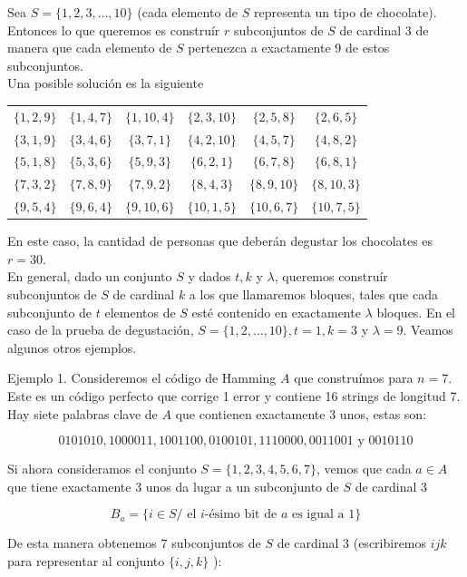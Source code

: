 \documentclass[10pt]{article}
\begin{document}
Sea $S=\{1,2,3, \ldots, 10\}$ (cada elemento de $S$ representa un tipo de chocolate). Entonces lo que queremos es construír $r$ subconjuntos de $S$ de cardinal 3 de manera que cada elemento de $S$ pertenezca a exactamente 9 de estos subconjuntos.\\
Una posible solución es la siguiente

\begin{center}
\begin{tabular}{cccccc}
$\{1,2,9\}$ & $\{1,4,7\}$ & $\{1,10,4\}$ & $\{2,3,10\}$ & $\{2,5,8\}$ & $\{2,6,5\}$ \\
$\{3,1,9\}$ & $\{3,4,6\}$ & $\{3,7,1\}$ & $\{4,2,10\}$ & $\{4,5,7\}$ & $\{4,8,2\}$ \\
$\{5,1,8\}$ & $\{5,3,6\}$ & $\{5,9,3\}$ & $\{6,2,1\}$ & $\{6,7,8\}$ & $\{6,8,1\}$ \\
$\{7,3,2\}$ & $\{7,8,9\}$ & $\{7,9,2\}$ & $\{8,4,3\}$ & $\{8,9,10\}$ & $\{8,10,3\}$ \\
$\{9,5,4\}$ & $\{9,6,4\}$ & $\{9,10,6\}$ & $\{10,1,5\}$ & $\{10,6,7\}$ & $\{10,7,5\}$ \\
\end{tabular}
\end{center}

En este caso, la cantidad de personas que deberán degustar los chocolates es $r=30$.\\
En general, dado un conjunto $S$ y dados $t, k$ y $\lambda$, queremos construír subconjuntos de $S$ de cardinal $k$ a los que llamaremos bloques, tales que cada subconjunto de $t$ elementos de $S$ esté contenido en exactamente $\lambda$ bloques. En el caso de la prueba de degustación, $S=\{1,2, \ldots, 10\}, t=1, k=3$ y $\lambda=9$. Veamos algunos otros ejemplos.

Ejemplo 1. Consideremos el código de Hamming $A$ que construímos para $n=7$. Este es un código perfecto que corrige 1 error y contiene 16 strings de longitud 7. Hay siete palabras clave de $A$ que contienen exactamente 3 unos, estas son:

$$
0101010,1000011,1001100,0100101,1110000,0011001 \text { y } 0010110
$$

Si ahora consideramos el conjunto $S=\{1,2,3,4,5,6,7\}$, vemos que cada $a \in A$ que tiene exactamente 3 unos da lugar a un subconjunto de $S$ de cardinal 3

$$
B_{a}=\{i \in S / \text { el } i \text {-ésimo bit de } a \text { es igual a } 1\}
$$

De esta manera obtenemos 7 subconjuntos de $S$ de cardinal 3 (escribiremos $i j k$ para representar al conjunto $\{i, j, k\}$ ):
\end{document}
